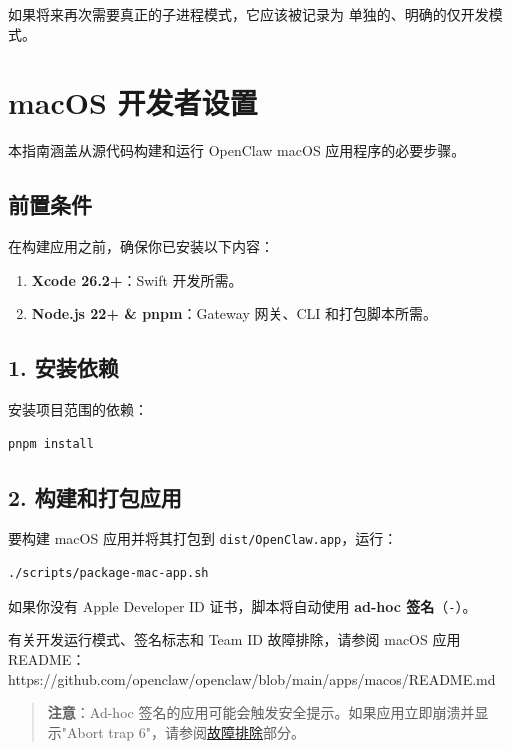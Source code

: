 如果将来再次需要真正的子进程模式，它应该被记录为
单独的、明确的仅开发模式。


\clearpage

\section{macOS 开发者设置}


本指南涵盖从源代码构建和运行 OpenClaw macOS 应用程序的必要步骤。

\subsection{前置条件}


在构建应用之前，确保你已安装以下内容：

\begin{enumerate}
  \item \textbf{Xcode 26.2+}：Swift 开发所需。
  \item \textbf{Node.js 22+ \& pnpm}：Gateway 网关、CLI 和打包脚本所需。
\end{enumerate}


\subsection{1. 安装依赖}


安装项目范围的依赖：

\begin{lstlisting}[language=bash]
pnpm install
\end{lstlisting}


\subsection{2. 构建和打包应用}


要构建 macOS 应用并将其打包到 \texttt{dist/OpenClaw.app}，运行：

\begin{lstlisting}[language=bash]
./scripts/package-mac-app.sh
\end{lstlisting}


如果你没有 Apple Developer ID 证书，脚本将自动使用 \textbf{ad-hoc 签名}（\texttt{-}）。

有关开发运行模式、签名标志和 Team ID 故障排除，请参阅 macOS 应用 README：
https://github.com/openclaw/openclaw/blob/main/apps/macos/README.md

\begin{quote}
\textbf{注意}：Ad-hoc 签名的应用可能会触发安全提示。如果应用立即崩溃并显示"Abort trap 6"，请参阅\href{\#troubleshooting}{故障排除}部分。
\end{quote}


